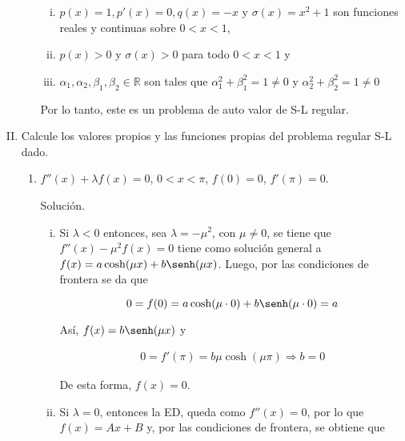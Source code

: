 \documentclass[fleqn]{article}
\newcommand{\real}{\mathbb{R}}
\begin{document}
\begin{enumerate}[I.]
\begin{enumerate}
			\begin{enumerate}[i)]
				\item $ p(x) = 1, p'(x) = 0, q(x) = -x $ y $ \sigma(x) = x^2 + 1 $ son funciones reales y continuas sobre $ 0 < x < 1 $,
				\item $ p(x) > 0 $ y $ \sigma(x) > 0 $ para todo $ 0 < x < 1 $ y
				\item $ \alpha_1, \alpha_2, \beta_1, \beta_2 \in \real $ son tales que $ \alpha_1^2 + \beta_1^2 = 1 \neq 0 $ y $ \alpha_2^2 + \beta_2^2 = 1 \neq 0 $
			\end{enumerate}

			Por lo tanto, este es un problema de auto valor de S-L regular.

		\end{enumerate}

		
		\bfseries
			
		\item Calcule los valores propios y las funciones propias del problema regular S-L dado.
		
		\begin{enumerate}
			\item $ f''(x) + \lambda f(x) = 0 $, $ 0 < x < \pi $, $ f(0) = 0 $, $ f'(\pi) = 0 $.
			
			Solución.
			
			\normalfont

			\begin{enumerate}[i)]
				\item Si $ \lambda < 0 $ entonces, sea $ \lambda = - \mu^2 $, con $ \mu \neq 0 $, se tiene que $ f''(x) - \mu^2 f(x) = 0 $
				tiene como solución general a $ f(x) = a \cosh(\mu x) + b \senh(\mu x) $. Luego, por las condiciones de frontera se da que
				
				\begin{equation*}
					0 = f(0) = a \cosh(\mu \cdot 0) + b \senh(\mu \cdot 0) = a
				\end{equation*}

				Así, $ f(x) = b \senh(\mu x) $ y 

				\begin{align*}
					0 = f'(\pi) = b \mu \cosh(\mu \pi) \Longrightarrow b = 0
				\end{align*}
				
				De esta forma, $ f(x) = 0 $.

				\item Si $ \lambda = 0 $, entonces la ED, queda como $ f''(x) = 0 $, por lo que $ f(x) = Ax + B $ y, por las condiciones de frontera, se obtiene que 
				

\end{enumerate}
\end{enumerate}
\end{enumerate}
\end{document}
